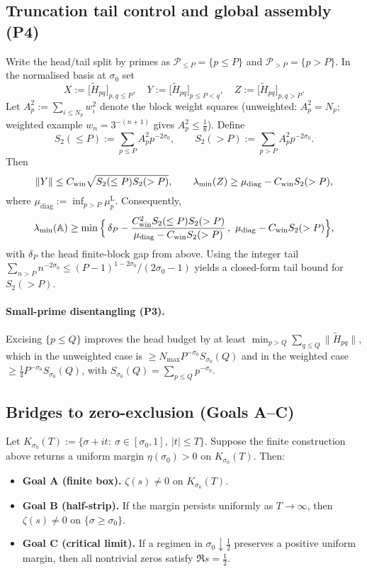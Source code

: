 \documentclass[11pt]{article}
\theoremstyle{definition}
\theoremstyle{remark}
\begin{document}
\subsection*{Truncation tail control and global assembly (P4)}
Write the head/tail split by primes as $\mathcal P_{\le P}=\{p\le P\}$ and $\mathcal P_{>P}=\{p>P\}$. In the normalised basis at $\sigma_0$ set
\[
 X:=\bigl[\widetilde H_{pq}\bigr]_{p,q\le P},\quad Y:=\bigl[\widetilde H_{pq}\bigr]_{p\le P<q},\quad Z:=\bigl[\widetilde H_{pq}\bigr]_{p,q>P}.
\]
Let $A_p^2:=\sum_{i\le N_p} w_i^2$ denote the block weight squares (unweighted: $A_p^2=N_p$; weighted example $w_n=3^{-(n+1)}$ gives $A_p^2\le\tfrac18$). Define
\[ S_2(\le P):=\sum_{p\le P} A_p^2 p^{-2\sigma_0},\qquad S_2(>P):=\sum_{p>P} A_p^2 p^{-2\sigma_0}. \]
Then
\[ \|Y\|\le C_{\rm win}\sqrt{S_2(\le P)S_2(>P)},\qquad \lambda_{\min}(Z)\ge \mu_{\mathrm{diag}}-C_{\rm win}S_2(>P), \]
where $\mu_{\mathrm{diag}}:=\inf_{p>P}\mu_p^{\mathrm L}$. Consequently,
\[ \lambda_{\min}(\mathbb A)\ge \min\Big\{\,\delta_P - \dfrac{C_{\rm win}^2 S_2(\le P)S_2(>P)}{\mu_{\mathrm{diag}}-C_{\rm win}S_2(>P)}\,,\ \mu_{\mathrm{diag}}-C_{\rm win}S_2(>P)\Big\}, \]
with $\delta_P$ the head finite-block gap from above. Using the integer tail $\sum_{n>P}n^{-2\sigma_0}\le (P-1)^{1-2\sigma_0}/(2\sigma_0-1)$ yields a closed-form tail bound for $S_2(>P)$.

\paragraph{Small-prime disentangling (P3).}
Excising $\{p\le Q\}$ improves the head budget by at least $\min_{p>Q}\sum_{q\le Q}\|\widetilde H_{pq}\|$, which in the unweighted case is $\ge N_{\max} P^{-\sigma_0} S_{\sigma_0}(Q)$ and in the weighted case $\ge \tfrac14 P^{-\sigma_0} S_{\sigma_0}(Q)$, with $S_{\sigma_0}(Q)=\sum_{p\le Q}p^{-\sigma_0}$.

\subsection*{Bridges to zero-exclusion (Goals A--C)}
Let $K_{\sigma_0}(T):=\{\sigma+it:\ \sigma\in[\sigma_0,1],\ |t|\le T\}$. Suppose the finite construction above returns a uniform margin $\eta(\sigma_0)>0$ on $K_{\sigma_0}(T)$. Then:
\begin{itemize}
  \item \textbf{Goal A (finite box).} $\zeta(s)\ne 0$ on $K_{\sigma_0}(T)$.
  \item \textbf{Goal B (half-strip).} If the margin persists uniformly as $T\to\infty$, then $\zeta(s)\ne 0$ on $\{\sigma\ge\sigma_0\}$.
  \item \textbf{Goal C (critical limit).} If a regimen in $\sigma_0\downarrow\tfrac12$ preserves a positive uniform margin, then all nontrivial zeros satisfy $\Re s=\tfrac12$.
\end{itemize}
\end{document}
